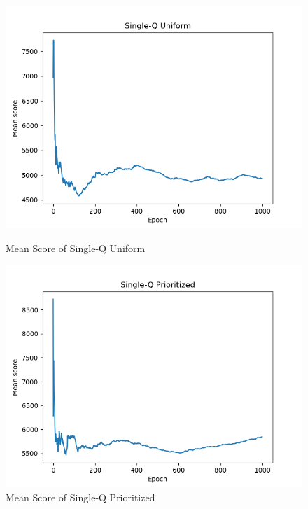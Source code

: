 \documentclass[conference]{IEEEtran}
\begin{document}
\begin{figure}[h]
\centering
\begin{minipage}{.5\textwidth}
     \centering
    \includegraphics[width=.91\textwidth]{SQU.png}
    \caption{Mean Score of Single-Q Uniform}
\end{minipage}%
\begin{minipage}{.5\textwidth}
     \centering
    \includegraphics[width=.91\textwidth]{SQP.png}
    \caption{Mean Score of Single-Q Prioritized}
\end{minipage}


\end{figure}
\end{document}
